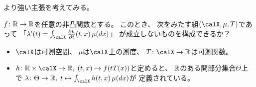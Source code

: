 \documentclass[report]{jlreq}
\begin{document}
\begin{answer}
    \TODO{}
\end{answer}

より強い主張を考えてみる。

\begin{problem}
    $f \colon \mathbb{R} \to \mathbb{R}$を任意の非凸関数とする。
    このとき、
    次をみたす組$(\calX, \mu, T)$であって
    「$\lambda'(t) = \int_\calX \deldel[h]{t}(t, x) \, \mu(dx)$」
    が成立しないものを構成できるか？
    \begin{itemize}
        \item $\calX$は可測空間、
            $\mu$は$\calX$上の測度、
            $T \colon \calX \to \R$は可測関数。
        \item $h \colon \R \times \calX \to \R, \; (t, x) \mapsto f(tT(x))$と定めると、
            $\mathbb{R}$のある開部分集合$\Theta$上で
            $\lambda \colon \Theta \to \R, \; t \mapsto \int_\calX h(t, x) \, \mu(dx)$が
            定義されている。
    \end{itemize}
\end{problem}

\begin{answer}
    \TODO{}
\end{answer}
\end{document}
